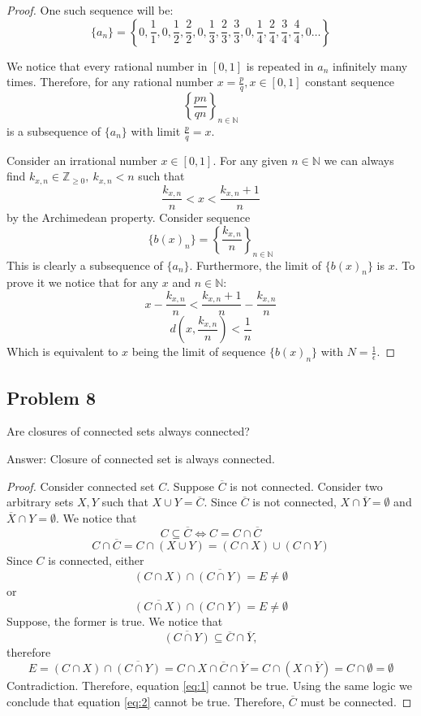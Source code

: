 \documentclass{article}
\begin{document}
\begin{proof}
One such sequence will be:
$$ \{ a_n \} = \left\{0, \frac{1}{1}, 0, \frac{1}{2}, \frac{2}{2}, 0, \frac{1}{3}, \frac{2}{3}, \frac{3}{3}, 0, \frac{1}{4}, \frac{2}{4}, \frac{3}{4}, \frac{4}{4}, 0 \dots \right\} $$

We notice that every rational number in $[0, 1]$ is repeated in $a_n$  infinitely many times. Therefore, for any rational number $x = \frac{p}{q}, x \in [0, 1]$ constant sequence
$$ \left\{ \frac{pn}{qn} \right\}_{n \in \mathbb{N}} $$
is a subsequence of $\{ a_n \}$ with limit $\frac{p}{q} = x$.

Consider an irrational number $x \in [0, 1]$. For any given $n \in \mathbb{N}$ we can always find $k_{x, n} \in \mathbb{Z}_{\geq 0}, \> k_{x, n} < n$ such that
$$ \frac{k_{x, n}}{n} < x < \frac{k_{x, n}+1}{n} $$
by the Archimedean property. Consider sequence
$$ \{ b(x)_n \} = \left\{ \frac{k_{x, n}}{n} \right\}_{n \in \mathbb{N}} $$
This is clearly a subsequence of $\{ a_n \}$. Furthermore, the limit of $\{ b(x)_n \}$ is $x$. To prove it we notice that for any $x$ and $n \in \mathbb{N}$:
$$ x - \frac{k_{x, n}}{n} < \frac{k_{x, n}+1}{n} - \frac{k_{x, n}}{n}$$ 
$$ d \left( x, \frac{k_{x, n}}{n} \right) < \frac{1}{n} $$ 
Which is equivalent to $x$ being the limit of sequence $\{ b(x)_n \}$ with $N = \frac{1}{\epsilon}$.
\end{proof}


\subsection*{Problem 8}

\begin{tcolorbox}
Are closures of connected sets always connected?
\end{tcolorbox}

Answer: Closure of connected set is always connected.

\begin{proof}
Consider connected set $C$. Suppose $\overline{C}$ is not connected. Consider two arbitrary sets $X, Y$ such that $X \cup Y = \overline{C}$. Since $\overline{C}$ is not connected, $X \cap \overline{Y} = \emptyset$ and $\overline{X} \cap Y = \emptyset$. We notice that
$$ C \subseteq \overline{C} \iff C = C \cap \overline{C} $$
$$ C \cap \overline{C} = C \cap (X \cup Y) = (C \cap X) \cup (C \cap Y) $$
Since $C$ is connected, either
\begin{equation}\label{eq:1}
(C \cap X) \cap \overline{(C \cap Y)} = E \neq \emptyset 
\end{equation}
or
\begin{equation}\label{eq:2}
\overline{(C \cap X)} \cap (C \cap Y) = E \neq \emptyset
\end{equation}
Suppose, the former is true. We notice that 
$$ \overline{(C \cap Y)} \subseteq \overline{C} \cap \overline{Y}, $$
therefore
$$ E = (C \cap X) \cap \overline{(C \cap Y)} = C \cap X \cap \overline{C} \cap \overline{Y} = C \cap (X \cap \overline{Y}) = C \cap \emptyset = \emptyset $$
Contradiction. Therefore, equation \ref{eq:1} cannot be true. Using the same logic we conclude that equation \ref{eq:2} cannot be true. Therefore, $\overline{C}$ must be connected.
\end{proof}
\end{document}
